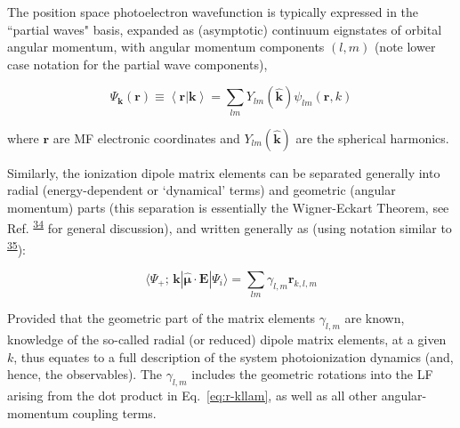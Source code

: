 \documentclass[10pt]{article}
\begin{document}
The position space photoelectron wavefunction is typically expressed in the ``partial waves" basis, expanded as (asymptotic) continuum eignstates of orbital angular momentum, with angular momentum components $(l,m)$ (note lower case notation for the partial wave components),  


\begin{equation}
\Psi_\mathbf{k}(\mathbf{r})\equiv\left<\mathbf{r}|\mathbf{k}\right> = \sum_{lm}Y_{lm}(\mathbf{\hat{k}})\psi_{lm}(\mathbf{r},k)
\label{eq:elwf}
\end{equation}

where $\mathbf{r}$ are MF electronic coordinates and $Y_{lm}(\mathbf{\hat{k}})$ are the spherical harmonics.

Similarly, the ionization dipole matrix elements can be separated generally into radial (energy-dependent or `dynamical' terms) and geometric (angular momentum) parts (this separation is essentially the Wigner-Eckart Theorem, see Ref. \textsuperscript{\hyperref[csl:34]{34}} for general discussion), and written generally as (using notation similar to \textsuperscript{\hyperref[csl:35]{35}}): 

\begin{equation}
\langle\Psi_{+};\,\mathbf{k}|\hat{\mathbf{\mu}}\cdot\boldsymbol{\mathbf{E}}|\Psi_{i}\rangle = \sum_{lm}\gamma_{l,m}\mathbf{r}_{k,l,m}
\label{eq:r-kllam}
\end{equation}


Provided that the geometric part of the matrix elements $\gamma_{l,m}$ are known, knowledge of the so-called radial (or reduced) dipole matrix elements, at a given 
$k$, %
thus equates to a full description of the system photoionization dynamics (and, hence, the observables). The $\gamma_{l,m}$ includes the geometric rotations  into the LF arising from the dot product in Eq.~\ref{eq:r-kllam}, as well as all other angular-momentum coupling terms.

\end{document}
